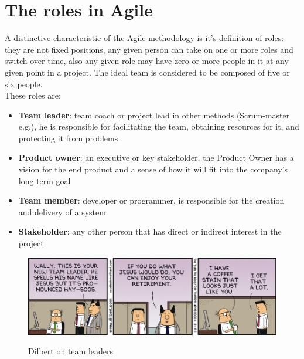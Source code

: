 \section{The roles in Agile}
	A distinctive characteristic of the Agile methodology is it's definition of roles: they are not fixed positions, any given person can take on one or more roles and switch over time, also any given role may have zero or more people in it at any given point in a project\cite{agileRoles}.
	The ideal team is considered to be composed of five or six people.\\
	These roles are:
	\begin{itemize}
		\item \textbf{Team leader}: team coach or project lead in other methods (Scrum-master e.g.), he is responsible for facilitating the team, obtaining resources for it, and protecting it from problems
		\item \textbf{Product owner}: an executive or key stakeholder, the Product Owner has a vision for the end product and a sense of how it will fit into the company’s long-term goal
		\item \textbf{Team member}: developer or programmer, is responsible for the creation and delivery of a system
		\item \textbf{Stakeholder}: any other person that has direct or indirect interest in the project
	\end{itemize}
	\begin{figure}[H]
		\centering
		\includegraphics[width=\textwidth]{resources/jesus}\\
		\caption{Dilbert on team leaders}
	\end{figure}

